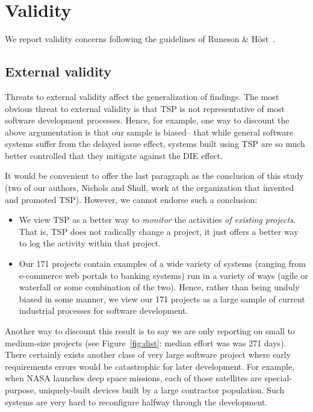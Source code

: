 \documentclass{sig-alternate}
\newcommand{\bi}{\begin{itemize}}%
\newcommand{\ei}{\end{itemize}}
\newcommand{\fig}[1]{Figure~\ref{fig:#1}}
\def\baselinestretch{1}
\begin{document}
%


 


 
 

\section{Validity}
We report validity concerns following the guidelines of Runeson \& H\"{o}st~\cite{runeson09}.

\subsection{External validity}
Threats to external validity affect the generalization of findings. The most obvious threat to external validity is that TSP is not representative of most software development processes. Hence,
for example, 
one way to discount the above argumentation is that our sample is biased-- that while general software
systems suffer from the delayed issue effect, systems built using TSP are so much better controlled
that they  mitigate against the DIE effect.

It would be convenient to offer the last paragraph as the conclusion of this study
(two of our authors, Nichols and Shull,  work at the organization that invented and promoted TSP).
 However, we cannot endorse such a conclusion:
 \bi
 \item
We view TSP as a better way to
 {\em monitor} the activities {\em of  existing projects}. That is, TSP
 does not radically change a project, it just offers a better way to log the activity within
 that project. 
 \item
 Our 171 projects contain examples of a wide variety
 of systems (ranging from e-commerce web portals to  banking systems) run in a variety of
 ways (agile or  waterfall or some combination of the two). Hence, rather
 than being unduly  biased in some manner,
 we view our 171 projects as a large sample of current industrial processes for software
 development.
 \ei
Another way to discount this result is to say we are only reporting on small to medium-size
projects
(see
\fig{dist}:  median
effort was was  
271 days). 
There certainly exists another class of very large software project where early requirements
errors would be catastrophic for later development. For example, when NASA launches deep space missions,
each of those satellites are special-purpose, uniquely-built devices built by a large contractor
population. Such systems are very hard to reconfigure halfway through the development.  
\end{document}

